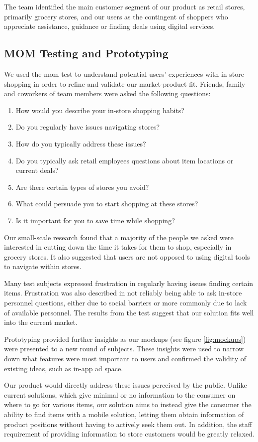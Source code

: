 \documentclass[titlepage]{article}
\begin{document}
The team identified the main customer segment of our product as retail stores, primarily grocery stores, and our users as the contingent of shoppers who appreciate assistance, 
guidance or finding deals using digital services.
\subsection{MOM Testing and Prototyping} 
We used the mom test to understand potential users' experiences with in-store shopping in order to refine and validate our market-product fit. 
Friends, family and coworkers of team members were asked the following questions:
\begin{enumerate}
    \item How would you describe your in-store shopping habits?
    \item Do you regularly have issues navigating stores?
    \item How do you typically address these issues?
    \item Do you typically ask retail employees questions about item locations or current deals?
    \item Are there certain types of stores you avoid?
    \item What could persuade you to start shopping at these stores?
    \item Is it important for you to save time while shopping?
\end{enumerate}
Our small-scale research found that a majority of the people we asked were interested in cutting down the time it takes for them to shop, especially in grocery stores. It also suggested that users are not opposed to using digital tools to navigate within stores.

Many test subjects expressed frustration in regularly having issues finding certain items. Frustration was also described in not reliably being able to ask in-store personnel questions, either due to social barriers or more commonly due to lack of available personnel. 
The results from the test suggest that our solution fits well into the current market.

Prototyping provided further insights as our mockups (see figure \ref{fig:mockups}) were presented to a new round of subjects. 
These insights were used to narrow down what features were most important to users and confirmed the validity of existing ideas, such as in-app ad space. 

Our product would directly address these issues perceived by the public. Unlike current solutions, which give minimal or no information to the consumer on where to go for various items,
our solution aims to instead give the consumer the ability to find items with a mobile solution,
letting them obtain information of product positions without having to actively seek them out.
In addition, the staff requirement of providing information to store customers would be greatly relaxed.
\end{document}
